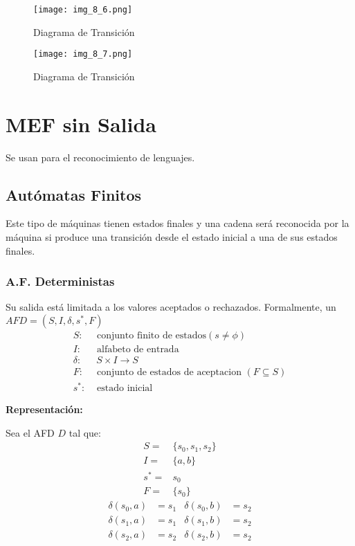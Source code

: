 \begin{figure}[h!]
\centering
\texttt{[image: img\_8\_6.png]}
\caption{Diagrama de Transición}\label{img_8_6}
\end{figure}
\begin{figure}[h!]
\centering
\texttt{[image: img\_8\_7.png]}
\caption{Diagrama de Transición}\label{img_8_7}
\end{figure}

\section{MEF sin Salida}
Se usan para el reconocimiento de lenguajes.
\subsection{Autómatas Finitos}

Este tipo de máquinas tienen estados finales y una cadena será reconocida por la máquina si produce una transición desde el estado inicial a una de sus estados finales.

\subsubsection{A.F. Deterministas}
Su salida está limitada a los valores aceptados o rechazados. Formalmente, un $AFD=(S,I,\delta, s^*,F)$
\begin{align*}
	S:	& \mbox{ conjunto finito de estados} (s\not=\phi)	\\
	I:	& \mbox{ alfabeto de entrada}	\\
	\delta:	&\; S\times I\rightarrow S	\\
	F:	& \mbox{ conjunto de estados de aceptacion } (F\subseteq S)	\\
	s^*:	& \mbox{ estado inicial}
\end{align*}

\textbf{Representación: }

Sea el AFD $D$ tal que:
\begin{align*}
S=	&\{s_0,s_1,s_2\}	\\
I=	&\{a,b\}	\\
s^*=	&s_0	\\
F=	&\{s_0\}
\end{align*}
\begin{align*}
\delta(s_0,a)	&=s_1	&\delta(s_0,b)	&=s_2	\\
\delta(s_1,a)	&=s_1	&\delta(s_1,b)	&=s_2	\\
\delta(s_2,a)	&=s_2	&\delta(s_2,b)	&=s_2	
\end{align*}

